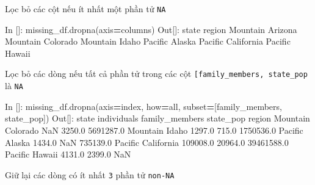 \documentclass[
]{book}
\newenvironment{Shaded}{\begin{snugshade}}{\end{snugshade}}
\newcommand{\FloatTok}[1]{\textcolor[rgb]{0.00,0.00,0.81}{#1}}
\newcommand{\NormalTok}[1]{#1}
\newcommand{\OperatorTok}[1]{\textcolor[rgb]{0.81,0.36,0.00}{\textbf{#1}}}
\newcommand{\StringTok}[1]{\textcolor[rgb]{0.31,0.60,0.02}{#1}}
\begin{document}
Lọc bỏ các cột nếu ít nhất một phần tử \texttt{NA}

\begin{Shaded}
\begin{Highlighting}[]
\NormalTok{In []: missing\_df.dropna(axis}\OperatorTok{=}\StringTok{\textquotesingle{}columns\textquotesingle{}}\NormalTok{)}
\NormalTok{Out[]:}
\NormalTok{               state}
\NormalTok{region              }
\NormalTok{Mountain     Arizona}
\NormalTok{Mountain    Colorado}
\NormalTok{Mountain       Idaho}
\NormalTok{Pacific       Alaska}
\NormalTok{Pacific   California}
\NormalTok{Pacific       Hawaii}
\end{Highlighting}
\end{Shaded}

Lọc bỏ các dòng nếu tất cả phần tử trong các cột \texttt{{[}\textquotesingle{}family\_members\textquotesingle{},\ \textquotesingle{}state\_pop\textquotesingle{}{]}} là \texttt{NA}

\begin{Shaded}
\begin{Highlighting}[]
\NormalTok{In []: missing\_df.dropna(axis}\OperatorTok{=}\StringTok{\textquotesingle{}index\textquotesingle{}}\NormalTok{, how}\OperatorTok{=}\StringTok{\textquotesingle{}all\textquotesingle{}}\NormalTok{, subset}\OperatorTok{=}\NormalTok{[}\StringTok{\textquotesingle{}family\_members\textquotesingle{}}\NormalTok{, }\StringTok{\textquotesingle{}state\_pop\textquotesingle{}}\NormalTok{])}
\NormalTok{Out[]:}
\NormalTok{               state  individuals  family\_members   state\_pop}
\NormalTok{region                                                       }
\NormalTok{Mountain    Colorado          NaN          }\FloatTok{3250.0}   \FloatTok{5691287.0}
\NormalTok{Mountain       Idaho       }\FloatTok{1297.0}           \FloatTok{715.0}   \FloatTok{1750536.0}
\NormalTok{Pacific       Alaska       }\FloatTok{1434.0}\NormalTok{             NaN    }\FloatTok{735139.0}
\NormalTok{Pacific   California     }\FloatTok{109008.0}         \FloatTok{20964.0}  \FloatTok{39461588.0}
\NormalTok{Pacific       Hawaii       }\FloatTok{4131.0}          \FloatTok{2399.0}\NormalTok{         NaN}
\end{Highlighting}
\end{Shaded}

Giữ lại các dòng có ít nhất \texttt{3} phần tử \texttt{non-NA}
\end{document}
